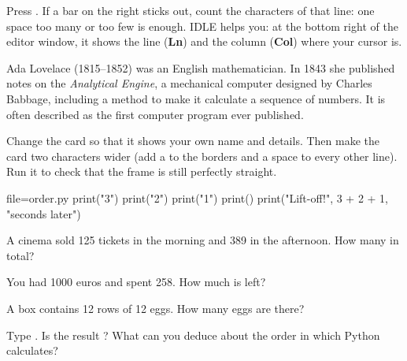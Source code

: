 Press . If a bar on the right sticks out, count the characters of that line: one space
too many or too few is enough. IDLE helps you: at the bottom right of the editor window, it shows
the line (\textbf{Ln}) and the column (\textbf{Col}) where your cursor is.

\begin{culture}
Ada Lovelace (1815--1852) was an English mathematician. In 1843 she published notes on the
\emph{Analytical Engine}, a mechanical computer designed by Charles Babbage, including a method to
make it calculate a sequence of numbers. It is often described as the first computer program ever
published.
\end{culture}

\begin{atoi}
Change the card so that it shows your own name and details. Then make the card two characters wider
(add a \py{-} to the borders and a space to every other line). Run it to check that the frame is
still perfectly straight.
\end{atoi}


\begin{questions}[2]
\item {}
\item {}
\item {}
\item {}
\item {}
\item {}
\end{questions}

\begin{code}{file=order.py}
print("3")
print("2")
print("1")
print()
print("Lift-off!", 3 + 2 + 1, "seconds later")
\end{code}

\begin{questions}
\item A cinema sold 125 tickets in the morning and 389 in the afternoon. How many in total?
\item You had 1000 euros and spent 258. How much is left?
\item A box contains 12 rows of 12 eggs. How many eggs are there?
\item Type . Is the result ? What can you deduce about the order in which
  Python calculates?
\end{questions}

